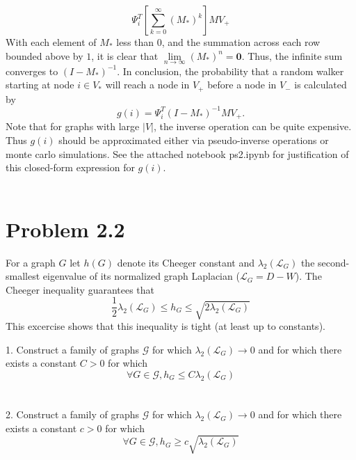 \documentclass{amsart}
\begin{document}
	\[
	\Psi_i^T \left[\sum_{k=0}^{\infty}\left( M_* \right)^k\right]MV_+
	\]
	With each element of $M_*$ less than $0$, and the summation across each row bounded above by $1$, it is clear that $\lim\limits_{n \rightarrow \infty} (M_*)^n = \mathbf{0}$. Thus, the infinite sum converges to $(I-M_*)^{-1}$. In conclusion, the probability that a random walker starting at node $i \in V_*$ will reach a node in $V_+$ before a node in $V_-$ is calculated by
	\[
	g(i) = \Psi_i^T\left( I - M_* \right)^{-1}MV_+.
	\]
	Note that for graphs with large $|V|$, the inverse operation can be quite expensive. Thus $g(i)$ should be approximated either via pseudo-inverse operations or monte carlo simulations. See the attached notebook \textsf{ps2.ipynb} for justification of this closed-form expression for $g(i)$.
	\\\\
	\section{Problem 2.2}
	For a graph $G$ let $h(G)$ denote its Cheeger constant and $\lambda_2(\mathcal{L}_G)$ the second-smallest eigenvalue of its normalized graph Laplacian ($\mathcal{L}_G = D - W$). The Cheeger inequality guarantees that 
	\[
	\frac{1}{2}\lambda_2(\mathcal{L}_G) \le h_G \le \sqrt{2\lambda_2(\mathcal{L}_G)}
	\]
	This excercise shows that this inequality is tight (at least up to constants).
	
	1. Construct a family of graphs $\mathcal{G}$ for which $\lambda_2(\mathcal{L}_G) \rightarrow 0$ and for which there exists a constant $C>0$ for which 
	\[
	\forall G \in \mathcal{G}, h_G \le C\lambda_2(\mathcal{L}_G)
	\]
	\\\\
	
	2. Construct a family of graphs $\mathcal{G}$ for which $\lambda_2(\mathcal{L}_G) \rightarrow 0$ and for which there exists a constant $c>0$ for which 
	\[
	\forall G \in \mathcal{G}, h_G \ge c\sqrt{\lambda_2(\mathcal{L}_G)}
	\]
	\\\\
	
\end{document}
